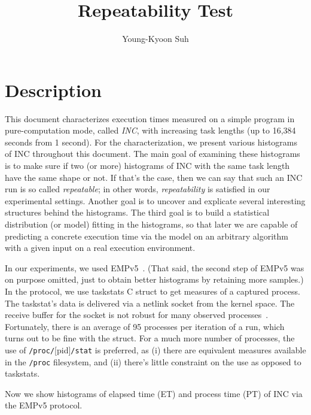 \documentclass[10pt]{article}
\begin{document}
\title{Repeatability Test}

\author{
Young-Kyoon Suh\\
}
\maketitle

\section{Description}
This document characterizes execution times 
measured on a simple program in pure-computation mode, called {\em INC}, 
with increasing task lengths (up to 16,384 seconds from 1 second). 
For the characterization, we present various histograms of INC throughout this document.
The main goal of examining these histograms is to make sure if 
two (or more) histograms of INC with the same task length 
have the same shape or not. If that's the case, then we can say that such an INC run is so called {\em repeatable}; 
in other words, {\em repeatability} is satisfied in our experimental settings. 
Another goal is to uncover and explicate several interesting structures behind the histograms. 
The third goal is to build a statistical distribution (or model) fitting in the histograms, so that later we 
are capable of predicting a concrete execution time via 
the model on an arbitrary algorithm with a given input on a real execution environment.

In our experiments, we used EMPv5~\cite{EMP}. 
(That said, the second step of EMPv5 was on purpose omitted, just to obtain better histograms by retaining more samples.) 
In the protocol, we use taskstats C struct to get measures of a captured process. 
The taskstat's data is delivered via a netlink socket from the kernel space. 
The receive buffer for the socket is not robust for many observed processes~\cite{Metrology}. 
Fortunately, there is an average of 95 processes per iteration of a run, 
which turns out to be fine with the struct. 
For a much more number of processes, 
the use of  {\tt /proc/}[pid]{\tt{/stat}} is preferred, 
as (i) there are equivalent measures available in the {\tt /proc} filesystem, 
and (ii) there's little constraint on the use as opposed to taskstats. 

Now we show histograms of elapsed time (ET) and process time (PT) of INC via the EMPv5 protocol.

\pagebreak



\pagebreak
\newpage
\end{document}
